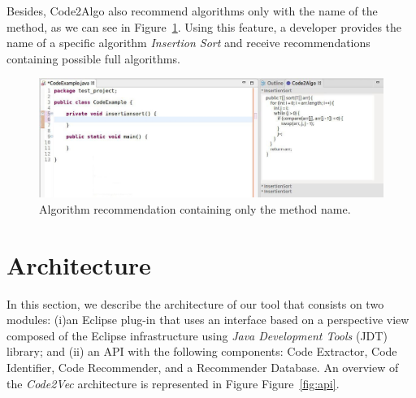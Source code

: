 \documentclass[12pt]{article}
\begin{document}
    Besides, Code2Algo also recommend algorithms only with the name of the method, as we can see in Figure~\ref{fig:flow}. Using this feature, a developer provides the name of a specific algorithm \textit{Insertion Sort} and receive recommendations containing possible full algorithms.
    
    \begin{figure}[h]
        \centering
        \includegraphics[width=\linewidth]{cbsoft19/figs/capturename.jpg}
        \caption{Algorithm recommendation containing only the method name.}
        \label{fig:flow}
    \end{figure}
    
    
    \section{Architecture}
    \label{sec:architecture}
    
    In this section, we describe the architecture of our tool that consists on two modules: (i)an Eclipse plug-in that uses an interface based on a perspective view composed of the Eclipse infrastructure using \textit{Java Development Tools} (JDT) library; and (ii) an API with the following components: Code Extractor, Code Identifier, Code Recommender, and a Recommender Database. An overview of the \textit{Code2Vec} architecture is represented in Figure Figure~\ref{fig:api}. 
    
\end{document}
